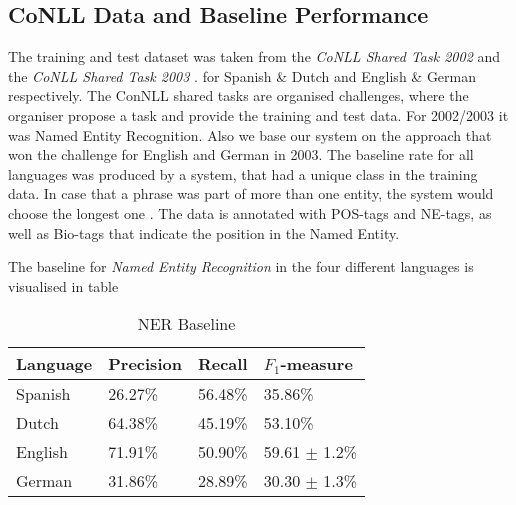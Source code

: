 \documentclass[11pt]{article}
\begin{document}
\subsection{CoNLL Data and Baseline Performance}
The training and test dataset was taken from the \emph{CoNLL Shared Task 2002} \cite{tksintro2002conll} and the \emph{CoNLL Shared Task 2003} \cite{TjongKimSang:2003:ICS:1119176.1119195}.
for Spanish \& Dutch and English \& German respectively. The ConNLL shared tasks are organised challenges, where the organiser propose a task and provide the
training and test data. For 2002/2003 it was Named Entity Recognition. Also we base our system on the approach that won the challenge for English and German in 2003. 
The baseline rate for all languages was produced by a system, that had a unique class in the training data. In case that a phrase was part of more than one entity, 
the system would choose the longest one \cite{TjongKimSang:2003:ICS:1119176.1119195}. 
The data is annotated with POS-tags and NE-tags, as well as Bio-tags that indicate the position in the Named Entity. 

The baseline for \emph{Named Entity Recognition} in the four different languages is visualised in table \
\begin{table}[h!]
\scriptsize
\begin{tabular}{|l|l|l|l|}
\hline
\bf Language & \bf Precision & \bf Recall & \bf $F_1$-measure \\ \hline
Spanish &             26.27\% & 56.48\% & 35.86\%        \\
Dutch  &             64.38\%  &45.19\%    & 53.10\%  \\
English &              71.91\%& 50.90\%  & 59.61 $\pm$ 1.2\%\\
German &      31.86\%  & 28.89\% & 30.30  $\pm$ 1.3\% \\
\hline
\end{tabular}
\caption{NER Baseline}
\label{table:Base}
\end{table}
\end{document}

